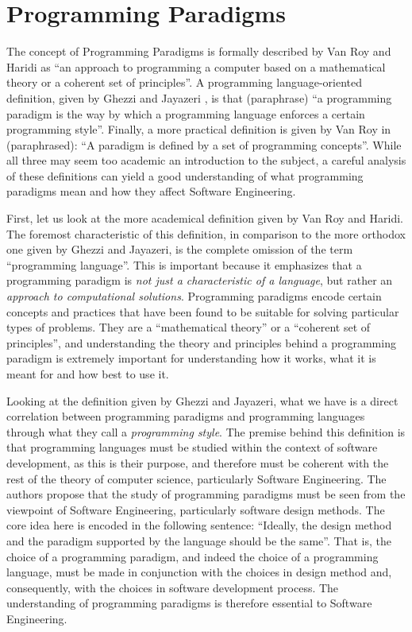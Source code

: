 \chapter{Programming Paradigms}
\label{ch:paradigms}

The concept of Programming Paradigms is formally described by Van Roy and Haridi \cite{VANROY:2004} as ``an approach to programming a computer based on a mathematical theory or a coherent set of principles''. A programming language-oriented definition, given by Ghezzi and Jayazeri \cite{GHEZZI:1997}, is that (paraphrase) ``a programming paradigm is the way by which a programming language enforces a certain programming style''. Finally, a more practical definition is given by Van Roy in \cite{VANROY:2009} (paraphrased): ``A paradigm is defined by a set of programming concepts''. While all three may seem too academic an introduction to the subject, a careful analysis of these definitions can yield a good understanding of what programming paradigms mean and how they affect Software Engineering.

First, let us look at the more academical definition given by Van Roy and Haridi. The foremost characteristic of this definition, in comparison to the more orthodox one given by Ghezzi and Jayazeri, is the complete omission of the term ``programming language''. This is important because it emphasizes that a programming paradigm is \emph{not just a characteristic of a language}, but rather an \emph{approach to computational solutions}. Programming paradigms encode certain concepts and practices that have been found to be suitable for solving particular types of problems. They are a ``mathematical theory'' or a ``coherent set of principles'', and understanding the theory and principles behind a programming paradigm is extremely important for understanding how it works, what it is meant for and how best to use it.

Looking at the definition given by Ghezzi and Jayazeri, what we have is a direct correlation between programming paradigms and programming languages through what they call a \emph{programming style}. The premise behind this definition is that programming languages must be studied within the context of software development, as this is their purpose, and therefore must be coherent with the rest of the theory of computer science, particularly Software Engineering. The authors propose that the study of programming paradigms must be seen from the viewpoint of Software Engineering, particularly software design methods. The core idea here is encoded in the following sentence: ``Ideally, the design method and the paradigm supported by the language should be the same''. That is, the choice of a programming paradigm, and indeed the choice of a programming language, must be made in conjunction with the choices in design method and, consequently, with the choices in software development process. The understanding of programming paradigms is therefore essential to Software Engineering.

